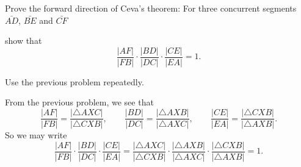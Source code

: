 \documentclass[newpage,hints,handout,nooutcomes,noauthor,12pt]{ximera}
\begin{document}
\begin{problem}
Prove the forward direction of Ceva's theorem: For three concurrent
segments $\bar{AD}$, $\bar{BE}$ and $\bar{CF}$
\begin{image}
\end{image}
show that
\[
\frac{|AF|}{|FB|}\cdot\frac{|BD|}{|DC|}\cdot\frac{|CE|}{|EA|}=1.
\]
\begin{hint}
Use the previous problem repeatedly.
\end{hint}
\begin{freeResponse}
From the previous problem, we see that
\[
\frac{|AF|}{|FB|}=\frac{|\triangle AXC|}{|\triangle CXB|},\qquad
\frac{|BD|}{|DC|}=\frac{|\triangle AXB|}{|\triangle AXC|},\qquad
\frac{|CE|}{|EA|}=\frac{|\triangle CXB|}{|\triangle AXB|}.
\]
So we may write
\[
\frac{|AF|}{|FB|}\cdot\frac{|BD|}{|DC|}\cdot\frac{|CE|}{|EA|} = 
\frac{|\triangle AXC|}{|\triangle CXB|}\cdot 
\frac{|\triangle AXB|}{|\triangle AXC|}\cdot
\frac{|\triangle CXB|}{|\triangle AXB|} = 1.
\]
\end{freeResponse}
\end{problem}
\end{document}
